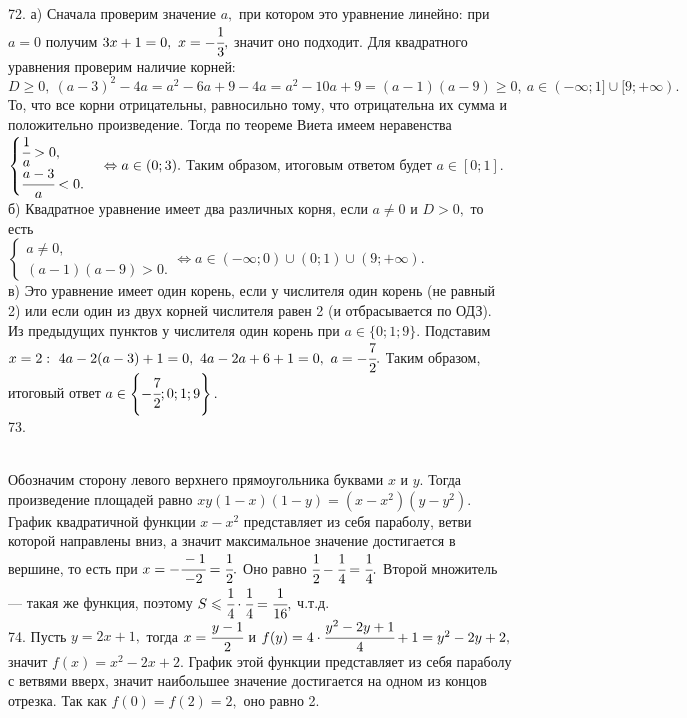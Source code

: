 72. а) Сначала проверим значение $a,$ при котором это уравнение линейно: при $a=0$ получим $3x+1=0,\ x=-\cfrac{1}{3},$ значит оно подходит. Для квадратного уравнения проверим наличие корней: $D\geqslant0,\ (a-3)^2-4a=a^2-6a+9-4a=a^2-10a+9=(a-1)(a-9)\geqslant0,\ a\in(-\infty;1]\cup[9;+\infty).$ То, что все корни отрицательны, равносильно тому, что отрицательна их сумма и положительно произведение. Тогда по теореме Виета имеем неравенства $\begin{cases} \cfrac{1}{a}>0,\\ \cfrac{a-3}{a}<0.\end{cases} \Leftrightarrow a\in (0;3).$ Таким образом, итоговым ответом будет $a\in[0;1].$\\
б) Квадратное уравнение имеет два различных корня, если $a\neq0$ и $D>0,$ то есть \\$\begin{cases}a\neq0,\\ (a-1)(a-9)>0.\end{cases}\Leftrightarrow a\in(-\infty;0)\cup(0;1)\cup(9;+\infty).$\\
в) Это уравнение имеет один корень, если у числителя один корень (не равный 2) или если один из двух корней числителя равен 2 (и отбрасывается по ОДЗ). Из предыдущих пунктов у числителя один корень при $a\in\{0; 1; 9\}.$ Подставим $x=2:\ 4a-2(a-3)+1=0,\ 4a-2a+6+1=0,\ a=-\cfrac{7}{2}.$ Таким образом, итоговый ответ $a\in \left\{-\cfrac{7}{2};0; 1; 9\right\}.$\\
73. \begin{figure}[ht!]
\end{figure}\\
Обозначим сторону левого верхнего прямоугольника буквами $x$ и $y.$ Тогда произведение площадей равно $xy(1-x)(1-y)=(x-x^2)(y-y^2).$ График квадратичной функции $x-x^2$ представляет из себя параболу, ветви которой направлены вниз, а значит максимальное значение достигается в вершине, то есть при $x=-\cfrac{-1}{-2}=\cfrac{1}{2}.$ Оно равно $\cfrac{1}{2}-\cfrac{1}{4}=\cfrac{1}{4}.$ Второй множитель --- такая же функция, поэтому $S\leqslant \cfrac{1}{4}\cdot \cfrac{1}{4}=\cfrac{1}{16},$ ч.т.д.\\
74. Пусть $y=2x+1,$ тогда $x=\cfrac{y-1}{2}$ и $f(y)=4\cdot\cfrac{y^2-2y+1}{4}+1=y^2-2y+2,$ значит $f(x)=x^2-2x+2.$ График этой функции представляет из себя параболу с ветвями вверх, значит наибольшее значение достигается на одном из концов отрезка. Так как $f(0)=f(2)=2,$ оно равно 2.\\
